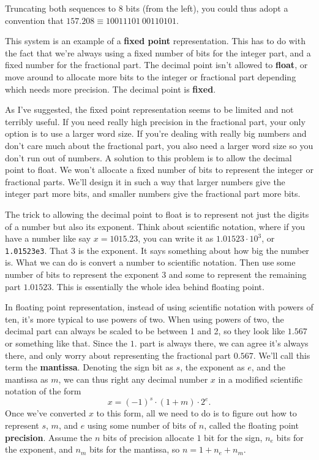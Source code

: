 \documentclass[
  letterpaper,
  DIV=11,
  numbers=noendperiod]{scrreprt}
\begin{document}
Truncating both sequences to 8 bits (from the left), you could thus
adopt a convention that \(157.208 \equiv 10011101 \ 00110101\).

This system is an example of a \textbf{fixed point} representation. This
has to do with the fact that we're always using a fixed number of bits
for the integer part, and a fixed number for the fractional part. The
decimal point isn't allowed to \textbf{float}, or move around to
allocate more bits to the integer or fractional part depending which
needs more precision. The decimal point is \textbf{fixed}.

As I've suggested, the fixed point representation seems to be limited
and not terribly useful. If you need really high precision in the
fractional part, your only option is to use a larger word size. If
you're dealing with really big numbers and don't care much about the
fractional part, you also need a larger word size so you don't run out
of numbers. A solution to this problem is to allow the decimal point to
float. We won't allocate a fixed number of bits to represent the integer
or fractional parts. We'll design it in such a way that larger numbers
give the integer part more bits, and smaller numbers give the fractional
part more bits.

The trick to allowing the decimal point to float is to represent not
just the digits of a number but also its exponent. Think about
scientific notation, where if you have a number like say \(x=1015.23\),
you can write it as \(1.01523 \cdot 10^3\), or \texttt{1.01523e3}. That
\(3\) is the exponent. It says something about how big the number is.
What we can do is convert a number to scientific notation. Then use some
number of bits to represent the exponent \(3\) and some to represent the
remaining part \(1.01523\). This is essentially the whole idea behind
floating point.

In floating point representation, instead of using scientific notation
with powers of ten, it's more typical to use powers of two. When using
powers of two, the decimal part can always be scaled to be between 1 and
2, so they look like \(1.567\) or something like that. Since the \(1.\)
part is always there, we can agree it's always there, and only worry
about representing the fractional part \(0.567\). We'll call this term
the \textbf{mantissa}. Denoting the sign bit as \(s\), the exponent as
\(e\), and the mantissa as \(m\), we can thus right any decimal number
\(x\) in a modified scientific notation of the form
\[x = (-1)^s \cdot (1+m) \cdot 2^{e}.\] Once we've converted \(x\) to
this form, all we need to do is to figure out how to represent \(s\),
\(m\), and \(e\) using some number of bits of \(n\), called the floating
point \textbf{precision}. Assume the \(n\) bits of precision allocate
\(1\) bit for the sign, \(n_e\) bits for the exponent, and \(n_m\) bits
for the mantissa, so \(n=1+n_e+n_m\).
\end{document}

